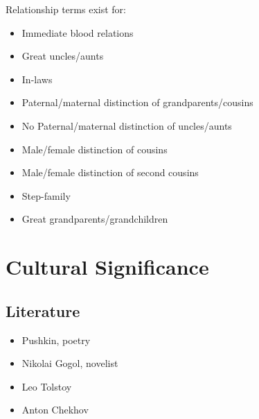 \documentclass[
  a4paperpaper,
]{report}
\providecommand{\tightlist}{%
  \setlength{\itemsep}{0pt}\setlength{\parskip}{0pt}}
\begin{document}
Relationship terms exist for:

\begin{itemize}
\tightlist
\item
  Immediate blood relations
\item
  Great uncles/aunts
\item
  In-laws
\item
  Paternal/maternal distinction of grandparents/cousins
\item
  No Paternal/maternal distinction of uncles/aunts
\item
  Male/female distinction of cousins
\item
  Male/female distinction of second cousins
\item
  Step-family
\item
  Great grandparents/grandchildren
\end{itemize}

\hypertarget{cultural-significance}{%
\chapter{Cultural Significance}\label{cultural-significance}}

\hypertarget{literature}{%
\section{Literature}\label{literature}}

\begin{itemize}
\tightlist
\item
  Pushkin, poetry
\item
  Nikolai Gogol, novelist
\item
  Leo Tolstoy
\item
  Anton Chekhov
\end{itemize}
\end{document}
